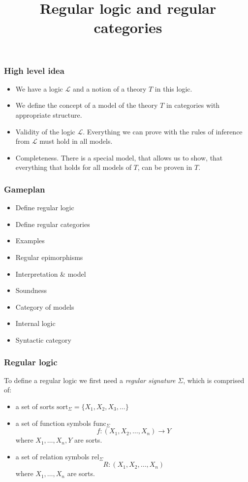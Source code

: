 \documentclass[14pt]{beamer}
\title{Regular logic and regular categories}
\author{}
\date{}
\theoremstyle{plain}
\begin{document}
  \begin{frame}
    \titlepage

  \end{frame}

  \begin{frame}
    \frametitle{High level idea}
    \pause
    \begin{itemize}
      \item We have a logic $\mathcal{L}$ and a notion of a theory $T$ in this logic.
      \pause
      \item We define the concept of a model of the theory $T$ in categories with appropriate structure.
      \pause
      \item Validity of the logic $\mathcal{L}$. Everything we can prove with the rules
        of inference from $\mathcal{L}$ must hold in all models.
      \pause
      \item Completeness. There is a special model, that allows us to show, that everything
        that holds for all models of $T$, can be proven in $T$.
    \end{itemize}
  \end{frame}

  \begin{frame}
    \frametitle{Gameplan}
    \begin{itemize}
      \item Define regular logic
      \item Define regular categories
      \item Examples
      \item Regular epimorphisms
      \item Interpretation \& model
      \item Soundness
      \item Category of models
      \item Internal logic
      \item Syntactic category
    \end{itemize}
  \end{frame}

  \begin{frame}
    \frametitle{Regular logic}
    To define a regular logic we first need a \emph{regular signature}
    $\Sigma$, which is comprised of:
    \begin{itemize}
      \pause
      \item a set of sorts $\mathrm{sort}_{\Sigma} = \{ X_{1}, X_{2}, X_{3}, \ldots{} \}$
      \pause
      \item a set of function symbols $\mathrm{func}_{\Sigma}$ 
      \[ f : ( X_{1}, X_{2}, \ldots, X_{n} ) \to Y \]
      where $X_{1}, \ldots{}, X_{n}, Y$ are sorts.
      \pause
      \item a set of relation symbols $\mathrm{rel}_{\Sigma}$ 
        \[ R : (X_{1}, X_{2}, \ldots, X_{n} ) \]
      where $X_{1}, \ldots{}, X_{n}$ are sorts.
      \end{itemize}
  \end{frame}
\end{document}
